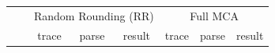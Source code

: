 \documentclass[11pt]{article}
\begin{document}
\begin{table}[]
    \centering
    \small
    \begin{subfigure}[t]{\linewidth}
    \centering
    \begin{tabular}{|ll|c|c|c|c|c|c|}
    \hline
    \multicolumn{2}{|c}{ \multirow{2}{*}{Application} } & \multicolumn{3}{|c|}{Random Rounding (RR)} & \multicolumn{3}{c|}{Full MCA} \\
    \cline{3-8}
    & & trace & parse & result & trace & parse & result \\
    \hline
    

\end{tabular}
\end{subfigure}
\end{table}
\end{document}

